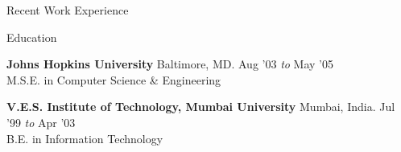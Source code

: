 \documentclass{resume} %
\begin{document}
\begin{rSection}{Recent Work Experience}
\begin{rSubsection}{}{}{}{}
\end{rSubsection}








\end{rSection}



\begin{rSection}{Education}

{\bf Johns Hopkins University} \hfill Baltimore, MD. Aug '03 {\em to} May '05 \\ 
M.S.E. in Computer Science \& Engineering


{\bf V.E.S. Institute of Technology, Mumbai University} \hfill Mumbai, India. Jul '99 {\em to} Apr '03 \\ 
B.E. in Information Technology

\end{rSection}





\end{document}
